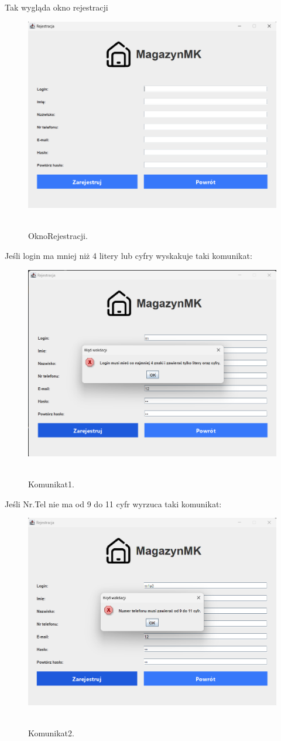 Tak wygląda okno rejestracji
\begin{figure}[H]
    \centering
    \includegraphics[width=.7\linewidth]{figures/OknoRejestracji.png}\
    \caption{OknoRejestracji.\label{OknoRejestracji}}
\end{figure}
Jeśli login ma mniej niż 4 litery lub cyfry wyskakuje taki komunikat:
\begin{figure}[H]
    \centering
    \includegraphics[width=.7\linewidth]{figures/RejestracjaKom1.png}\
    \caption{Komunikat1.\label{Komunikat1}}
\end{figure}
Jeśli Nr.Tel nie ma od 9 do 11 cyfr wyrzuca taki komunikat:
\begin{figure}[H]
    \centering
    \includegraphics[width=.7\linewidth]{figures/RejestracjaKom2.png}\
    \caption{Komunikat2.\label{Komunikat2}}
\end{figure}
